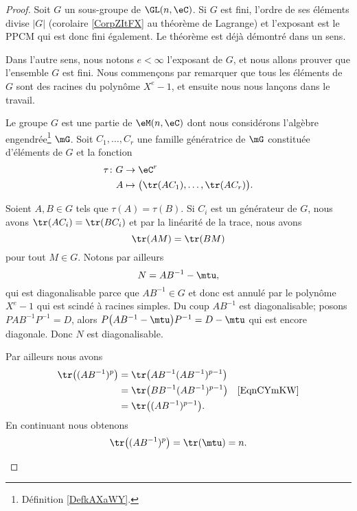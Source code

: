 \begin{proof}
	Soit \( G\) un sous-groupe de \( \GL(n,\eC)\). Si \( G\) est fini, l'ordre de ses éléments divise \( | G |\) (corolaire \ref{CorpZItFX} au théorème de Lagrange) et l'exposant est le PPCM qui est donc fini également. Le théorème est déjà démontré dans un sens.

	Dans l'autre sens, nous notons \( e<\infty\) l'exposant de \( G\), et nous allons prouver que l'ensemble \( G\) est fini. Nous commençons par remarquer que tous les éléments de \( G\) sont des racines du polynôme \( X^e-1\), et ensuite nous nous lançons dans le travail.

	\begin{subproof}
		\spitem[Générateurs]

		Le groupe \( G\) est une partie de \( \eM(n,\eC)\) dont nous considérons l'algèbre engendrée\footnote{Définition \ref{DefkAXaWY}.} \( \mG\). Soit \( C_1,\ldots, C_r\) une famille génératrice de \( \mG\) constituée d'éléments de \( G\) et la fonction
		\begin{equation}
			\begin{aligned}
				\tau\colon G & \to \eC^r                                        \\
				A            & \mapsto \big( \tr(AC_1),\ldots, \tr(AC_r) \big).
			\end{aligned}
		\end{equation}

		 Soient \( A,B\in G\) tels que \( \tau(A)=\tau(B)\). Si \( C_i\) est un générateur de \( G\), nous avons \( \tr(AC_i)=\tr(BC_i)\) et par la linéarité de la trace, nous avons
		\begin{equation}    \label{EqnCYmKW}
			\tr(AM)=\tr(BM)
		\end{equation}
		pour tout \( M\in G\). Notons par ailleurs
		\begin{equation}
			N=AB^{-1}-\mtu,
		\end{equation}
		qui est diagonalisable parce que \( AB^{-1}\in G\) et donc est annulé par le polynôme \( X^e-1\) qui est scindé à racines simples. Du coup \( AB^{-1}\) est diagonalisable; posons \( PAB^{-1}P^{-1}=D\), alors \( P\big( AB^{-1}-\mtu \big)P^{-1}=D-\mtu\) qui est encore diagonale. Donc \( N\) est diagonalisable.

		Par ailleurs nous avons
		\begin{subequations}
			\begin{align}
				\tr\big( (AB^{-1})^p \big) & =\tr\big( AB^{-1}(AB^{-1})^{p-1} \big)                           \\
				                           & =\tr\big( BB^{-1}(AB^{-1})^{p-1} \big) & \text{\eqref{EqnCYmKW}} \\
				                           & =\tr\big( (AB^{-1})^{p-1} \big).
			\end{align}
		\end{subequations}
		En continuant nous obtenons
		\begin{equation}
			\tr\big(  (AB^{-1})^p \big)=\tr(\mtu)=n.
		\end{equation}


\end{subproof}
\end{proof}

